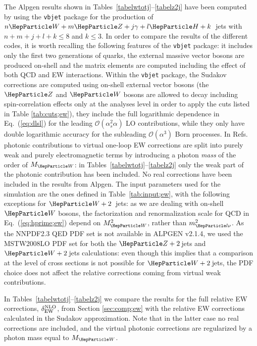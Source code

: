 \documentclass[11pt]{cernrep}
\begin{document}
The {\sc Alpgen} results shown in
Tables~\ref{tabelwtotj}--\ref{tabelz2j} have been computed by using
the {\tt vbjet} package for the production of
$n\PW+m\PZ+j\gamma+l\PH+k$~jets with $n+m+j+l+k \leq 8$ and $k \leq 3$. In
order to compare the results of the different codes, it is worth
recalling the following features of the {\tt vbjet} package: it
includes only the first two generations of quarks, the external
massive vector bosons are produced on-shell and the matrix elements
are computed including the effect of both QCD and EW interactions.
Within the {\tt vbjet} package, the Sudakov corrections are computed
using on-shell external vector bosons (the $\PZ$ and $\PW$ bosons are
allowed to decay including spin-correlation effects only at the
analyses level in order to apply the cuts listed in Table
\ref{tab:cuts;ew}), they include the full logarithmic dependence in
Eq.~(\ref{eq:dlsl}) for the leading $\mathcal{O}(\alpha_s^{2} \alpha)$
LO contributions, while they only have double logarithmic accuracy for
the subleading $\mathcal{O}( \alpha^3 )$ Born processes. In
Refs.~\cite{Denner:2000jv,Denner:2001gw} photonic contributions to
virtual one-loop EW corrections are split into purely weak
and purely electromagnetic terms by introducing a photon \emph{mass}
of the order of $M_{\PW}$: in Tables~\ref{tabelwtotj}--\ref{tabelz2j}
only the weak part of the photonic contribution has been included. 
No real corrections have been included in the results from {\sc Alpgen}.
The input parameters used for the simulation are the ones defined in
Table~\ref{tab:input;ew}, with the following exceptions for
$\PW+2$~jets: as we are dealing with on-shell $\PW$ bosons, the
factorization and renormalization scale for QCD in
Eq.~(\ref{eq:hprime;ew}) depend on $M_{\PW}^2$, rather than $m_{\Pl
  \nu}^2$. As the {\sc NNPDF2.3 QED} PDF set is not available in {\sc
  ALPGEN v2.1.4}, we used the {\sc MSTW2008LO} PDF set for both the
$\PZ+2\,$jets and $\PW+2\,$jets calculations: even though this implies
that a comparison at the level of cross sections is not possible for
$\PW+2\,$jets, the PDF choice does not affect the relative corrections
coming from virtual weak contributions.

In Tables~\ref{tabelwtotj}--\ref{tabelz2j} we compare the results for
the full relative EW corrections, $\delta^{\rm NLO}_{\rm EW}$, from
Section \ref{sec:comp;ew} with the relative EW corrections calculated
in the Sudakov approximation. Note that in the latter case no real
corrections are included, and the
virtual photonic corrections are regularized by a photon mass equal to
$M_{\PW}$.
\end{document}
